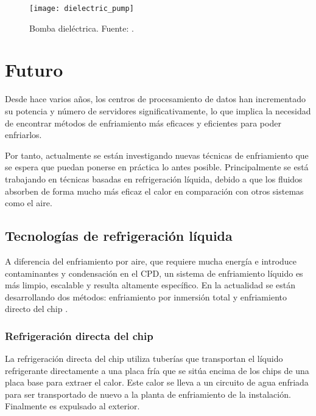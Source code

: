\begin{figure}[H]
    \begin{center}
        \texttt{[image: dielectric\_pump]}
        \caption{Bomba dieléctrica. Fuente: \cite{Kelvion}.}
        \label{dielectric_pump}
    \end{center}
\end{figure}




\section{Futuro} \label{futuro}

Desde hace varios años, los centros de procesamiento de datos han incrementado su potencia y número de servidores significativamente, lo que implica la necesidad de encontrar métodos de enfriamiento más eficaces y eficientes para poder enfriarlos.

Por tanto, actualmente se están investigando nuevas técnicas de enfriamiento que se espera que puedan ponerse en práctica lo antes posible. Principalmente se está trabajando en técnicas basadas en refrigeración líquida, debido a que los fluidos absorben de forma mucho más eficaz el calor en comparación con otros sistemas como el aire.


\subsection{Tecnologías de refrigeración líquida}

A diferencia del enfriamiento por aire, que requiere mucha energía e introduce contaminantes y condensación en el CPD, un sistema de enfriamiento líquido es más limpio, escalable y resulta altamente específico. En la actualidad se están desarrollando dos métodos: enfriamiento por inmersión total y enfriamiento directo del chip \cite{datacenters-future}.


\subsubsection{Refrigeración directa del chip}

La refrigeración directa del chip utiliza tuberías que transportan el líquido refrigerante directamente a una placa fría que se sitúa encima de los chips de una placa base para extraer el calor. Este calor se lleva a un circuito de agua enfriada para ser transportado de nuevo a la planta de enfriamiento de la instalación. Finalmente es expulsado al exterior.

